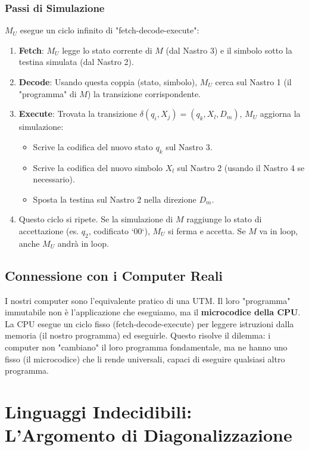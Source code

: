 \documentclass[a4paper]{article}
\theoremstyle{remark} %
\begin{document}
\subsubsection{Passi di Simulazione}
$M_U$ esegue un ciclo infinito di "fetch-decode-execute":
\begin{enumerate}
    \item \textbf{Fetch}: $M_U$ legge lo stato corrente di $M$ (dal Nastro 3) e il simbolo sotto la testina simulata (dal Nastro 2).
    \item \textbf{Decode}: Usando questa coppia (stato, simbolo), $M_U$ cerca sul Nastro 1 (il "programma" di $M$) la transizione corrispondente.
    \item \textbf{Execute}: Trovata la transizione $\delta(q_i, X_j) = (q_k, X_l, D_m)$, $M_U$ aggiorna la simulazione:
    \begin{itemize}
        \item Scrive la codifica del nuovo stato $q_k$ sul Nastro 3.
        \item Scrive la codifica del nuovo simbolo $X_l$ sul Nastro 2 (usando il Nastro 4 se necessario).
        \item Sposta la testina sul Nastro 2 nella direzione $D_m$.
    \end{itemize}
    \item Questo ciclo si ripete. Se la simulazione di $M$ raggiunge lo stato di accettazione (es. $q_2$, codificato `00`), $M_U$ si ferma e accetta. Se $M$ va in loop, anche $M_U$ andrà in loop.
\end{enumerate}

\subsection{Connessione con i Computer Reali}
I nostri computer sono l'equivalente pratico di una UTM. Il loro "programma" immutabile non è l'applicazione che eseguiamo, ma il \textbf{microcodice della CPU}. La CPU esegue un ciclo fisso (fetch-decode-execute) per leggere istruzioni dalla memoria (il nostro programma) ed eseguirle. Questo risolve il dilemma: i computer non "cambiano" il loro programma fondamentale, ma ne hanno uno fisso (il microcodice) che li rende universali, capaci di eseguire qualsiasi altro programma.

\section{Linguaggi Indecidibili: L'Argomento di Diagonalizzazione}
\end{document}
